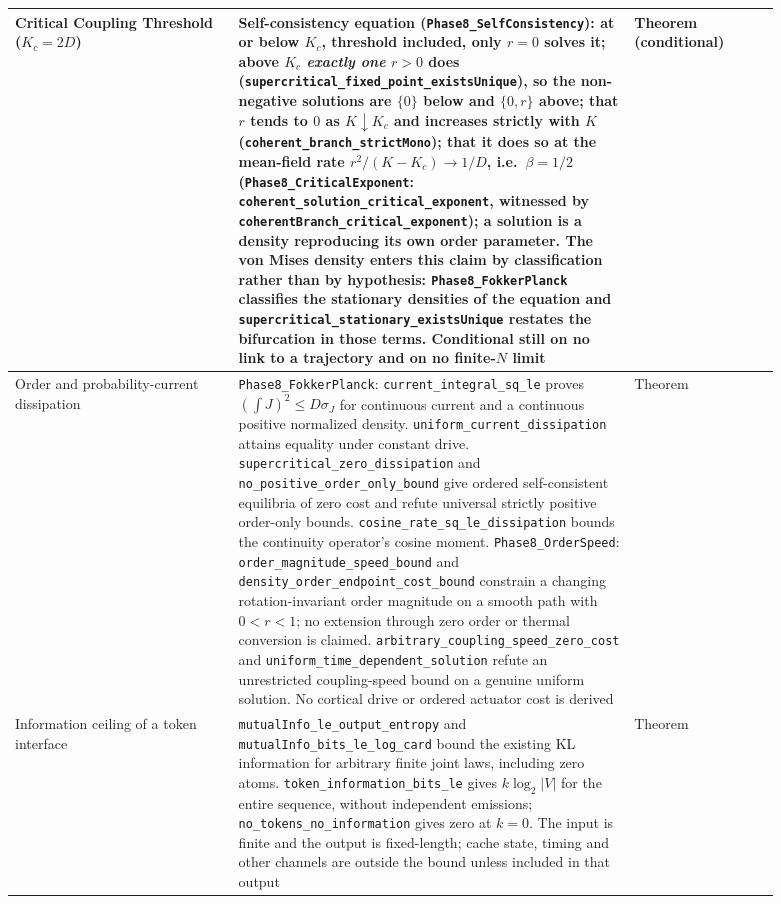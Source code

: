 \documentclass{article}
\begin{document}
\begin{longtable}{|>{\raggedright\arraybackslash}p{0.26\linewidth}|>{\raggedright\arraybackslash}p{0.46\linewidth}|>{\raggedright\arraybackslash}p{0.17\linewidth}|}
Critical Coupling Threshold ($K_c = 2D$) & Self-consistency equation (\nolinkurl{Phase8_SelfConsistency}): at or below $K_c$, threshold included, only $r = 0$ solves it; above $K_c$ \emph{exactly one} $r > 0$ does (\nolinkurl{supercritical_fixed_point_existsUnique}), so the non-negative solutions are $\{0\}$ below and $\{0, r\}$ above; that $r$ tends to $0$ as $K \downarrow K_c$ and increases strictly with $K$ (\nolinkurl{coherent_branch_strictMono}); that it does so at the mean-field rate $r^2/(K-K_c) \to 1/D$, i.e.\ $\beta = 1/2$ (\nolinkurl{Phase8_CriticalExponent}: \nolinkurl{coherent_solution_critical_exponent}, witnessed by \nolinkurl{coherentBranch_critical_exponent}); a solution is a density reproducing its own order parameter. The von Mises density enters this claim by classification rather than by hypothesis: \nolinkurl{Phase8_FokkerPlanck} classifies the stationary densities of the equation and \nolinkurl{supercritical_stationary_existsUnique} restates the bifurcation in those terms. Conditional still on no link to a trajectory and on no finite-$N$ limit & Theorem (conditional) \\ \hline
Order and probability-current dissipation & \nolinkurl{Phase8_FokkerPlanck}: \nolinkurl{current_integral_sq_le} proves $(\int J)^2\leq D\sigma_J$ for continuous current and a continuous positive normalized density. \nolinkurl{uniform_current_dissipation} attains equality under constant drive. \nolinkurl{supercritical_zero_dissipation} and \nolinkurl{no_positive_order_only_bound} give ordered self-consistent equilibria of zero cost and refute universal strictly positive order-only bounds. \nolinkurl{cosine_rate_sq_le_dissipation} bounds the continuity operator's cosine moment. \nolinkurl{Phase8_OrderSpeed}: \nolinkurl{order_magnitude_speed_bound} and \nolinkurl{density_order_endpoint_cost_bound} constrain a changing rotation-invariant order magnitude on a smooth path with $0<r<1$; no extension through zero order or thermal conversion is claimed. \nolinkurl{arbitrary_coupling_speed_zero_cost} and \nolinkurl{uniform_time_dependent_solution} refute an unrestricted coupling-speed bound on a genuine uniform solution. No cortical drive or ordered actuator cost is derived & Theorem \\ \hline
Information ceiling of a token interface & \nolinkurl{mutualInfo_le_output_entropy} and \nolinkurl{mutualInfo_bits_le_log_card} bound the existing KL information for arbitrary finite joint laws, including zero atoms. \nolinkurl{token_information_bits_le} gives $k\log_2|V|$ for the entire sequence, without independent emissions; \nolinkurl{no_tokens_no_information} gives zero at $k=0$. The input is finite and the output is fixed-length; cache state, timing and other channels are outside the bound unless included in that output & Theorem \\ \hline

\end{longtable}
\end{document}
